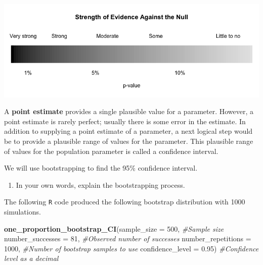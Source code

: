 \documentclass[
]{report}
\newenvironment{Shaded}{\begin{snugshade}}{\end{snugshade}}
\newcommand{\CommentTok}[1]{\textcolor[rgb]{0.56,0.35,0.01}{\textit{#1}}}
\newcommand{\DataTypeTok}[1]{\textcolor[rgb]{0.13,0.29,0.53}{#1}}
\newcommand{\DecValTok}[1]{\textcolor[rgb]{0.00,0.00,0.81}{#1}}
\newcommand{\FloatTok}[1]{\textcolor[rgb]{0.00,0.00,0.81}{#1}}
\newcommand{\KeywordTok}[1]{\textcolor[rgb]{0.13,0.29,0.53}{\textbf{#1}}}
\newcommand{\NormalTok}[1]{#1}
\providecommand{\tightlist}{%
  \setlength{\itemsep}{0pt}\setlength{\parskip}{0pt}}
\begin{document}
\begin{center}\includegraphics[width=0.9\linewidth]{images/soe_gradient_grayscale} \end{center}

\newpage

A \textbf{point estimate} provides a single plausible value for a parameter. However, a point estimate is rarely perfect; usually there is some error in the estimate. In addition to supplying a point estimate of a parameter, a next logical step would be to provide a plausible range of values for the parameter. This plausible range of values for the population parameter is called a confidence interval.

We will use bootstrapping to find the 95\% confidence interval.

\begin{enumerate}
\def\labelenumi{\arabic{enumi}.}
\setcounter{enumi}{23}
\tightlist
\item
  In your own words, explain the bootstrapping process.
  \vspace{1in}
\end{enumerate}

The following \texttt{R} code produced the following bootstrap distribution with 1000 simulations.

\begin{Shaded}
\begin{Highlighting}[]
\KeywordTok{one\_proportion\_bootstrap\_CI}\NormalTok{(}\DataTypeTok{sample\_size =} \DecValTok{500}\NormalTok{, }\CommentTok{\#Sample size}
                    \DataTypeTok{number\_successes =} \DecValTok{81}\NormalTok{, }\CommentTok{\#Observed number of successes}
                    \DataTypeTok{number\_repetitions =} \DecValTok{1000}\NormalTok{, }\CommentTok{\#Number of bootstrap samples to use}
                    \DataTypeTok{confidence\_level =} \FloatTok{0.95}\NormalTok{) }\CommentTok{\#Confidence level as a decimal}
\end{Highlighting}
\end{Shaded}
\end{document}
